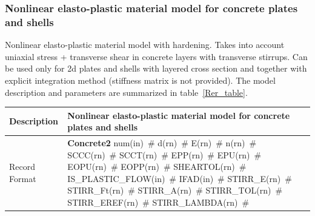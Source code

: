 \documentclass[epsf,a4paper]{article}
\newcommand{\descitem}[1]{{\noindent \bf #1}}
\newcommand{\elemparam}[2]{{{#1\tiny (#2)}~\#}}
\begin{document}
\subsubsection{Nonlinear elasto-plastic material model for concrete
plates and shells}
\label{Rer}
Nonlinear elasto-plastic material model with hardening. 
Takes into account uniaxial stress + transverse shear in concrete
layers with transverse stirrups. 
Can be used only for 2d plates and shells with layered cross section 
and together with explicit integration method (stiffness matrix is not
provided). 
The model description and parameters are summarized
in table~\ref{Rer_table}.

\begin{table}[h]                                                                
\begin{tabular}{|l|p{9cm}|}                                                      
\hline                                                                          
Description & Nonlinear elasto-plastic material model for concrete
plates and shells\\
\hline                                                                          
Record Format & \descitem{Concrete2} \elemparam{num}{in}
\elemparam{d}{rn} \elemparam{E}{rn} \elemparam{n}{rn}
\elemparam{SCCC}{rn} \elemparam{SCCT}{rn} \elemparam{EPP}{rn} \elemparam{EPU}{rn} 
\elemparam{EOPU}{rn} \elemparam{EOPP}{rn} \elemparam{SHEARTOL}{rn}
\elemparam{IS\_PLASTIC\_FLOW}{in} \elemparam{IFAD}{in} \elemparam{STIRR\_E}{rn} \elemparam{STIRR\_Ft}{rn}
\elemparam{STIRR\_A}{rn} \elemparam{STIRR\_TOL}{rn} \elemparam{STIRR\_EREF}{rn}
\elemparam{STIRR\_LAMBDA}{rn}\\ 


\end{tabular}
\end{table}
\end{document}
